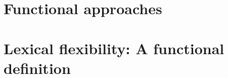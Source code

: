 
\section{Functional approaches}
\label{sec:2.4}

\section{Lexical flexibility: A functional definition}
\label{sec:2.5}

